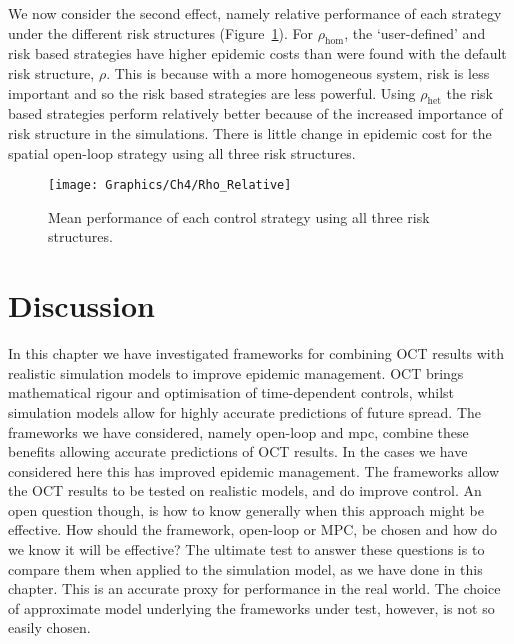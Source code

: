 We now consider the second effect, namely relative performance of each strategy under the different risk structures (Figure~\ref{fig:ch4:rho_relative}). For $\rho_{\mathrm{hom}}$, the `user-defined' and risk based strategies have higher epidemic costs than were found with the default risk structure, $\rho$. This is because with a more homogeneous system, risk is less important and so the risk based strategies are less powerful. Using $\rho_{\mathrm{het}}$ the risk based strategies perform relatively better because of the increased importance of risk structure in the simulations. There is little change in epidemic cost for the spatial open-loop strategy using all three risk structures.

\begin{figure}[h]
    \begin{center}
        \texttt{[image: Graphics/Ch4/Rho\_Relative]}
        \caption{Mean performance of each control strategy using all three risk structures.}
        \label{fig:ch4:rho_relative}
    \end{center}
\end{figure}

\FloatBarrier

\section{Discussion}
\label{sec:ch4:Discussion}

In this chapter we have investigated frameworks for combining OCT results with realistic simulation models to improve epidemic management. OCT brings mathematical rigour and optimisation of time-dependent controls, whilst simulation models allow for highly accurate predictions of future spread. The frameworks we have considered, namely open-loop and mpc, combine these benefits allowing accurate predictions of OCT results. In the cases we have considered here this has improved epidemic management. The frameworks allow the OCT results to be tested on realistic models, and do improve control. An open question though, is how to know generally when this approach might be effective. How should the framework, open-loop or MPC, be chosen and how do we know it will be effective? The ultimate test to answer these questions is to compare them when applied to the simulation model, as we have done in this chapter. This is an accurate proxy for performance in the real world. The choice of approximate model underlying the frameworks under test, however, is not so easily chosen.

